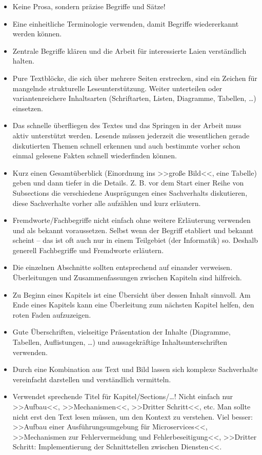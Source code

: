 \begin{itemize}
\item Keine Prosa, sondern präzise Begriffe und Sätze!
\item Eine einheitliche Terminologie verwenden, damit Begriffe wiedererkannt werden können.
\item Zentrale Begriffe klären und die Arbeit für interessierte Laien verständlich halten.
\item Pure Textblöcke, die sich über mehrere Seiten erstrecken, sind ein Zeichen für mangelnde strukturelle Leseunterstützung. Weiter unterteilen oder variantenreichere Inhaltsarten (Schriftarten, Listen, Diagramme, Tabellen, \ldots) einsetzen.
\item Das schnelle überfliegen des Textes und das Springen in der Arbeit muss aktiv unterstützt werden. Lesende müssen jederzeit die wesentlichen gerade diskutierten Themen schnell erkennen und auch bestimmte vorher schon einmal gelesene Fakten schnell wiederfinden können.
\item Kurz einen Gesamtüberblick (Einordnung ins >>große Bild<<, eine Tabelle) geben und dann tiefer in die Details. Z. B. vor dem Start einer Reihe von Subsections die verschiedene Ausprägungen eines Sachverhalts diskutieren, diese Sachverhalte vorher alle aufzählen und kurz erläutern.
\item Fremdworte/Fachbegriffe nicht einfach ohne weitere Erläuterung verwenden und als bekannt voraussetzen. Selbst wenn der Begriff etabliert und bekannt scheint -- das ist oft auch nur in einem Teilgebiet (der Informatik) so. Deshalb generell Fachbegriffe und Fremdworte erläutern.
\item Die einzelnen Abschnitte sollten entsprechend auf einander verweisen. Überleitungen und Zusammenfassungen zwischen Kapiteln sind hilfreich.
\item Zu Beginn eines Kapitels ist eine Übersicht über dessen Inhalt sinnvoll. Am Ende eines Kapitels kann eine Überleitung zum nächsten Kapitel helfen, den roten Faden aufzuzeigen.
\item Gute Überschriften, vielseitige Präsentation der Inhalte (Diagramme, Tabellen, Auflistungen, \ldots) und aussagekräftige Inhaltsunterschriften verwenden.
\item Durch eine Kombination aus Text und Bild lassen sich komplexe Sachverhalte vereinfacht darstellen und verständlich vermitteln.
\item Verwendet sprechende Titel für Kapitel/Sections/\ldots! Nicht einfach nur >>Aufbau<<, >>Mechanismen<<, >>Dritter Schritt<<, etc. Man sollte nicht erst den Text lesen müssen, um den Kontext zu verstehen. Viel besser: >>Aufbau einer Ausführungsumgebung für Microservices<<, >>Mechanismen zur Fehlervermeidung und Fehlerbeseitigung<<, >>Dritter Schritt: Implementierung der Schnittstellen zwischen Diensten<<.

\end{itemize}
